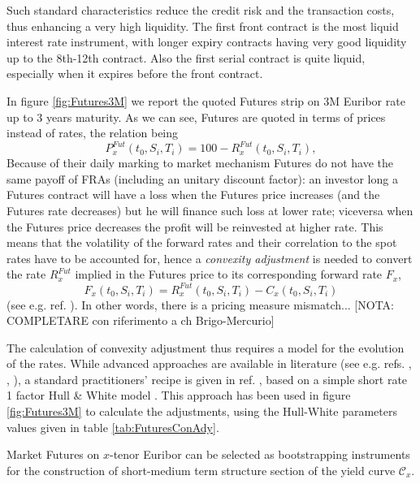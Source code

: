\documentclass[11pt,reqno]{amsart}
\begin{document}
Such standard characteristics reduce the credit risk and the transaction costs, thus enhancing a very high liquidity. The first front contract is the most liquid interest rate instrument, with longer expiry contracts having very good liquidity up to the 8th-12th contract. Also the first serial contract is quite liquid, especially when it expires before the front contract.
\par
In figure \ref{fig:Futures3M} we report the quoted Futures strip on 3M Euribor rate up to 3 years maturity. As we can see, Futures are quoted in terms of prices instead of rates, the relation being
\begin{equation}
P^{Fut}_x\left(t_0,S_i,T_i\right) = 100 - R^{Fut}_x\left(t_0,S_i,T_i\right),
\label{eqn:FuturePriceRate}
\end{equation}
Because of their daily marking to market mechanism Futures do not have the same payoff of FRAs (including an unitary discount factor): an investor long a Futures contract will have a loss when the Futures price increases (and the Futures rate decreases) but he will finance such loss at lower rate; viceversa when the Futures price decreases the profit will be reinvested at higher rate. This means that the volatility of the forward rates and their correlation to the spot rates have to be accounted for, hence a \emph{convexity adjustment} is needed to convert the rate $R^{Fut}_x$ implied in the Futures price to its corresponding forward rate $F_x$,
\begin{equation}
F_x\left(t_0,S_i,T_i\right) = R^{Fut}_x\left(t_0,S_i,T_i\right)-C_x\left(t_0,S_i,T_i\right)
\label{eqn:fwdfromfutureprice}
\end{equation}
(see e.g. ref. \cite{JacKaw05}). In other words, there is a pricing measure mismatch... [NOTA: COMPLETARE con riferimento a ch Brigo-Mercurio]
\par
The calculation of convexity adjustment thus requires a model for the evolution of the rates.  While advanced approaches are available in literature (see e.g. refs. \cite{JacKaw05}, \cite{PitRen06}, \cite{BriMer06}), a standard practitioners' recipe is given in ref. \cite{KirNov1997}, based on a simple short rate 1 factor Hull \& White model \cite{HulWhi1990}. This approach has been used in figure \ref{fig:Futures3M} to calculate the adjustments, using the  Hull-White parameters values given in table \ref{tab:FuturesConAdy}.
\par
Market Futures on $x$-tenor Euribor can be selected as bootstrapping instruments for the construction of short-medium term structure section of the yield curve $\mathcal{C}_x$.
\end{document}
